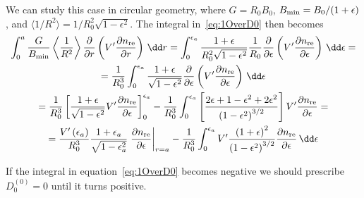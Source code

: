 \documentclass{notes}
\begin{document}
	We can study this case in circular geometry, where $G=R_0B_0$,
	$B_{\rm min}=B_0/(1+\epsilon)$, and
	$\langle 1/R^2\rangle=1/R_0^2\sqrt{1-\epsilon^2}$. The integral
	in~\eqref{eq:1OverD0} then becomes
	\begin{equation}
		\begin{gathered}
			\int_0^a \frac{G}{B_{\rm min}}\left\langle \frac{1}{R^2} \right\rangle
				\frac{\partial}{\partial r}\left(
					V'\frac{\partial n_{\rm re}}{\partial r}
				\right)\,\dd r =
				\int_0^{\epsilon_a} \frac{1+\epsilon}{R_0^2\sqrt{1-\epsilon^2}}
				\frac{1}{R_0}
				\frac{\partial}{\partial\epsilon}\left(
					V'\frac{\partial n_{\rm re}}{\partial\epsilon}
				\right)
				\,\dd\epsilon =\\
				= \frac{1}{R_0^3}\int_0^{\epsilon_a} \frac{1+\epsilon}{\sqrt{1-\epsilon^2}}
				\frac{\partial}{\partial\epsilon}\left(
					V'\frac{\partial n_{\rm re}}{\partial\epsilon}
				\right)
				\,\dd\epsilon
				\\
				= \frac{1}{R_0^3}\left[
					\frac{1+\epsilon}{\sqrt{1-\epsilon^2}}
					V'\frac{\partial n_{\rm re}}{\partial\epsilon}
				\right]_0^{\epsilon_a}
				-
				\frac{1}{R_0^3}\int_0^{\epsilon_a} \left[
					\frac{2\epsilon + 1 - \epsilon^2 + 2\epsilon^2}{\left(1-\epsilon^2\right)^{3/2}}
				\right] V'\frac{\partial n_{\rm re}}{\partial\epsilon} =\\
				= \frac{V'\left(\epsilon_a\right)}{R_0^3}
				\frac{1+\epsilon_a}{\sqrt{1-\epsilon_a^2}}
				\left.\frac{\partial n_{\rm re}}{\partial\epsilon}\right|_{r=a} -
				\frac{1}{R_0^3}\int_0^{\epsilon_a}
					V'\frac{\left(1+\epsilon\right)^2}{\left(1-\epsilon^2\right)^{3/2}}
					\frac{\partial n_{\rm re}}{\partial\epsilon}\,\dd\epsilon
		\end{gathered}
	\end{equation}

	If the integral in equation~\eqref{eq:1OverD0} becomes negative we should
	prescribe $D_0^{(0)}=0$ until it turns positive.
\end{document}
